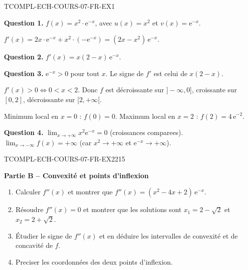 \begin{corrige}{TCOMPL-ECH-COURS-07-FR-EX1}

\textbf{Question 1.} $f(x) = x^2 \cdot \mathrm{e}^{-x}$, avec $u(x) = x^2$ et $v(x) = \mathrm{e}^{-x}$.

$f'(x) = 2x \cdot \mathrm{e}^{-x} + x^2 \cdot (-\mathrm{e}^{-x}) = (2x - x^2)\,\mathrm{e}^{-x}$.

\textbf{Question 2.} $f'(x) = x(2-x)\,\mathrm{e}^{-x}$.

\textbf{Question 3.} $\mathrm{e}^{-x} > 0$ pour tout $x$. Le signe de $f'$ est celui de $x(2-x)$.

$f'(x) > 0 \iff 0 < x < 2$. Donc $f$ est décroissante sur $]-\infty, 0]$, croissante sur $[0, 2]$, décroissante sur $[2, +\infty[$.

Minimum local en $x = 0$ : $f(0) = 0$. Maximum local en $x = 2$ : $f(2) = 4\,\mathrm{e}^{-2}$.

\textbf{Question 4.} $\lim_{x \to +\infty} x^2 \mathrm{e}^{-x} = 0$ (croissances comparees). $\lim_{x \to -\infty} f(x) = +\infty$ (car $x^2 \to +\infty$ et $\mathrm{e}^{-x} \to +\infty$).

\end{corrige}

\bigskip


\begin{exercice}{TCOMPL-ECH-COURS-07-FR-EX2}{2}{15}

\textbf{Partie B -- Convexité et points d'inflexion}

\begin{enumerate}
  \item Calculer $f''(x)$ et montrer que $f''(x) = (x^2 - 4x + 2)\,\mathrm{e}^{-x}$.
  \item Résoudre $f''(x) = 0$ et montrer que les solutions sont $x_1 = 2 - \sqrt{2}$ et $x_2 = 2 + \sqrt{2}$.
  \item Étudier le signe de $f''(x)$ et en déduire les intervalles de convexité et de concavité de $f$.
  \item Preciser les coordonnées des deux points d'inflexion.
\end{enumerate}

\end{exercice}

